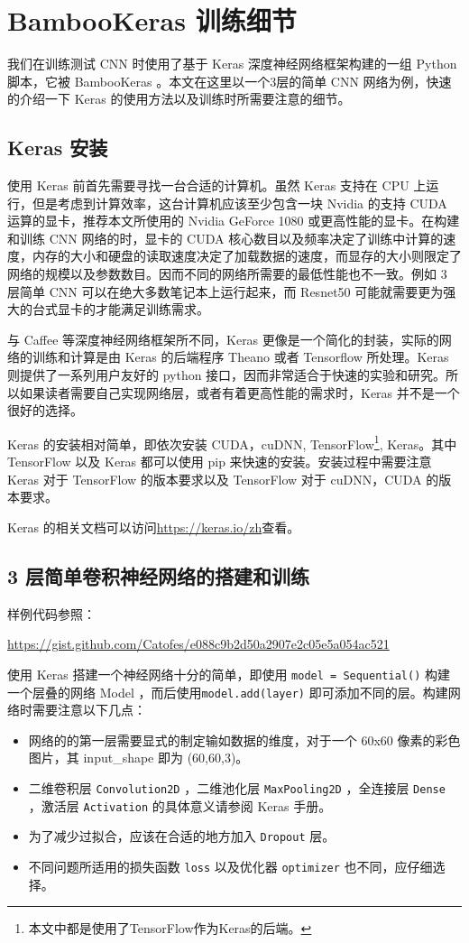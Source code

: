 \chapter{BambooKeras 训练细节}
\label{section:train_details}

我们在训练测试 CNN 时使用了基于 Keras 深度神经网络框架构建的一组 Python 脚本，它被 BambooKeras 。本文在这里以一个3层的简单 CNN 网络为例，快速的介绍一下 Keras 的使用方法以及训练时所需要注意的细节。

\section{Keras 安装}
使用 Keras 前首先需要寻找一台合适的计算机。虽然 Keras 支持在 CPU 上运行，但是考虑到计算效率，这台计算机应该至少包含一块 Nvidia 的支持 CUDA 运算的显卡，推荐本文所使用的 Nvidia GeForce 1080 或更高性能的显卡。在构建和训练 CNN 网络的时，显卡的 CUDA 核心数目以及频率决定了训练中计算的速度，内存的大小和硬盘的读取速度决定了加载数据的速度，而显存的大小则限定了网络的规模以及参数数目。因而不同的网络所需要的最低性能也不一致。例如 3 层简单 CNN 可以在绝大多数笔记本上运行起来，而 Resnet50 可能就需要更为强大的台式显卡的才能满足训练需求。

与 Caffee 等深度神经网络框架所不同，Keras 更像是一个简化的封装，实际的网络的训练和计算是由 Keras 的后端程序 Theano 或者 Tensorflow 所处理。Keras 则提供了一系列用户友好的 python 接口，因而非常适合于快速的实验和研究。所以如果读者需要自己实现网络层，或者有着更高性能的需求时，Keras 并不是一个很好的选择。

Keras 的安装相对简单，即依次安装 CUDA，cuDNN, TensorFlow\footnote{本文中都是使用了TensorFlow作为Keras的后端。}, Keras。其中 TensorFlow 以及 Keras 都可以使用 pip 来快速的安装。安装过程中需要注意 Keras 对于 TensorFlow 的版本要求以及 TensorFlow 对于 cuDNN，CUDA 的版本要求。 

Keras 的相关文档可以访问\url{https://keras.io/zh}查看。

\section{3 层简单卷积神经网络的搭建和训练}

样例代码参照：

\url{https://gist.github.com/Catofes/e088c9b2d50a2907e2c05e5a054ac521}

使用 Keras 搭建一个神经网络十分的简单，即使用 \verb|model = Sequential()| 构建一个层叠的网络 Model ，而后使用\verb|model.add(layer)| 即可添加不同的层。构建网络时需要注意以下几点：
\begin{itemize}
    \item 网络的的第一层需要显式的制定输如数据的维度，对于一个 60x60 像素的彩色图片，其 input\_shape 即为 (60,60,3)。
    \item 二维卷积层 \verb|Convolution2D| ，二维池化层 \verb|MaxPooling2D| ，全连接层 \verb|Dense| ，激活层 \verb|Activation| 的具体意义请参阅 Keras 手册。
    \item 为了减少过拟合，应该在合适的地方加入 \verb|Dropout| 层。
    \item 不同问题所适用的损失函数 \verb|loss| 以及优化器 \verb|optimizer| 也不同，应仔细选择。
\end{itemize}

